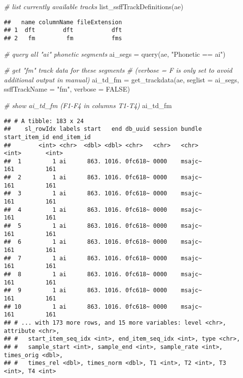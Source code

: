 \documentclass[
]{book}
\newenvironment{Shaded}{\begin{snugshade}}{\end{snugshade}}
\newcommand{\AttributeTok}[1]{\textcolor[rgb]{0.77,0.63,0.00}{#1}}
\newcommand{\CommentTok}[1]{\textcolor[rgb]{0.56,0.35,0.01}{\textit{#1}}}
\newcommand{\ConstantTok}[1]{\textcolor[rgb]{0.00,0.00,0.00}{#1}}
\newcommand{\FunctionTok}[1]{\textcolor[rgb]{0.00,0.00,0.00}{#1}}
\newcommand{\NormalTok}[1]{#1}
\newcommand{\OtherTok}[1]{\textcolor[rgb]{0.56,0.35,0.01}{#1}}
\newcommand{\StringTok}[1]{\textcolor[rgb]{0.31,0.60,0.02}{#1}}
\begin{document}
\begin{Shaded}
\begin{Highlighting}[]
\CommentTok{\# list currently available tracks}
\FunctionTok{list\_ssffTrackDefinitions}\NormalTok{(ae)}
\end{Highlighting}
\end{Shaded}

\begin{verbatim}
##   name columnName fileExtension
## 1  dft        dft           dft
## 2   fm         fm           fms
\end{verbatim}

\begin{Shaded}
\begin{Highlighting}[]
\CommentTok{\# query all "ai" phonetic segments}
\NormalTok{ai\_segs }\OtherTok{=} \FunctionTok{query}\NormalTok{(ae, }\StringTok{"Phonetic == ai"}\NormalTok{)}

\CommentTok{\# get "fm" track data for these segments}
\CommentTok{\# (verbose = F is only set to avoid additional output in manual)}
\NormalTok{ai\_td\_fm }\OtherTok{=} \FunctionTok{get\_trackdata}\NormalTok{(ae,}
                         \AttributeTok{seglist =}\NormalTok{ ai\_segs,}
                         \AttributeTok{ssffTrackName =} \StringTok{"fm"}\NormalTok{,}
                         \AttributeTok{verbose =} \ConstantTok{FALSE}\NormalTok{)}

\CommentTok{\# show ai\_td\_fm (F1{-}F4 in columns T1{-}T4)}
\NormalTok{ai\_td\_fm}
\end{Highlighting}
\end{Shaded}

\begin{verbatim}
## # A tibble: 183 x 24
##    sl_rowIdx labels start   end db_uuid session bundle start_item_id end_item_id
##        <int> <chr>  <dbl> <dbl> <chr>   <chr>   <chr>          <int>       <int>
##  1         1 ai      863. 1016. 0fc618~ 0000    msajc~           161         161
##  2         1 ai      863. 1016. 0fc618~ 0000    msajc~           161         161
##  3         1 ai      863. 1016. 0fc618~ 0000    msajc~           161         161
##  4         1 ai      863. 1016. 0fc618~ 0000    msajc~           161         161
##  5         1 ai      863. 1016. 0fc618~ 0000    msajc~           161         161
##  6         1 ai      863. 1016. 0fc618~ 0000    msajc~           161         161
##  7         1 ai      863. 1016. 0fc618~ 0000    msajc~           161         161
##  8         1 ai      863. 1016. 0fc618~ 0000    msajc~           161         161
##  9         1 ai      863. 1016. 0fc618~ 0000    msajc~           161         161
## 10         1 ai      863. 1016. 0fc618~ 0000    msajc~           161         161
## # ... with 173 more rows, and 15 more variables: level <chr>, attribute <chr>,
## #   start_item_seq_idx <int>, end_item_seq_idx <int>, type <chr>,
## #   sample_start <int>, sample_end <int>, sample_rate <int>, times_orig <dbl>,
## #   times_rel <dbl>, times_norm <dbl>, T1 <int>, T2 <int>, T3 <int>, T4 <int>
\end{verbatim}
\end{document}
